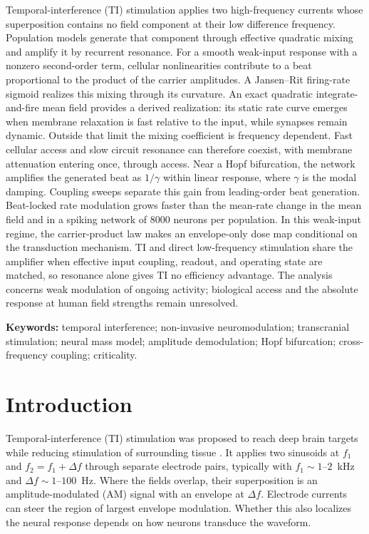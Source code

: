 \documentclass[11pt,a4paper]{article}
\begin{document}
\else
\noindent
Temporal-interference (TI) stimulation applies two high-frequency currents whose
superposition contains no field component at their low difference frequency. Population
models generate that component through effective quadratic mixing and amplify it by
recurrent resonance. For a smooth weak-input response with a nonzero second-order term,
cellular nonlinearities contribute to a beat proportional to the product of the carrier
amplitudes. A Jansen--Rit firing-rate sigmoid realizes this mixing through its curvature.
An exact quadratic integrate-and-fire mean field provides a derived realization: its
static rate curve emerges when membrane relaxation is fast relative to the input, while
synapses remain dynamic. Outside that limit the mixing coefficient is frequency
dependent. Fast cellular access and slow circuit resonance can therefore coexist, with
membrane attenuation entering once, through access. Near a Hopf bifurcation, the network amplifies the
generated beat as $1/\gamma$ within linear response, where $\gamma$ is the modal damping.
Coupling sweeps separate this gain from leading-order beat generation. Beat-locked rate
modulation grows faster than the mean-rate change in the mean field and in a spiking
network of $8000$ neurons per population. In this weak-input regime, the carrier-product
law makes an envelope-only dose map conditional on the transduction mechanism. TI and
direct low-frequency stimulation share the amplifier when effective input coupling,
readout, and operating state are matched, so resonance alone gives TI no efficiency
advantage. The analysis concerns weak modulation of
ongoing activity; biological access and the absolute response at human field strengths
remain unresolved.
\fi

\smallskip
\noindent\textbf{Keywords:} temporal interference; non-invasive neuromodulation;
transcranial stimulation; neural mass model; amplitude demodulation; Hopf bifurcation;
cross-frequency coupling; criticality.

\clearpage
\tableofcontents
\clearpage

\section{Introduction}
Temporal-interference (TI) stimulation was proposed to reach deep brain targets while
reducing stimulation of surrounding tissue \cite{grossman2017}. It applies two sinusoids at
$f_1$ and $f_2=f_1+\Delta f$ through separate electrode pairs, typically with
$f_1\sim1$--$2$~kHz and $\Delta f\sim1$--$100$~Hz. Where the fields overlap, their
superposition is an amplitude-modulated (AM) signal with an envelope at $\Delta f$.
Electrode currents can steer the region of largest envelope modulation. Whether this
also localizes the neural response depends on how neurons transduce the waveform.
\end{document}
